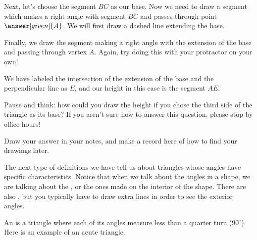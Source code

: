 \documentclass{ximera}
\begin{document}
\begin{example}
Next, let's choose the segment $BC$ as our base. Now we need to draw a segment which makes a right angle with segment $BC$ and passes through point $\answer[given]{A}$. We will first draw a dashed line extending the base.
\begin{image}
\end{image}
Finally, we draw the segment making a right angle with the extension of the base and passing through vertex $A$. Again, try doing this with your protractor on your own!
\begin{image}
\end{image}
We have labeled the intersection of the extension of the base and the perpendicular line as $E$, and our height in this case is the segment $AE$.
\end{example}
\begin{question}
Pause and think: how could you draw the height if you chose the third side of the triangle as its base? If you aren't sure how to answer this question, please stop by office hours!
\begin{freeResponse}
Draw your answer in your notes, and make a record here of how to find your drawings later.
\end{freeResponse}
\end{question}

The next type of definitions we have tell us about triangles whose angles have specific characteristics. Notice that when we talk about the angles in a shape, we are talking about the , or the ones made on the interior of the shape. There are also , but you typically have to draw extra lines in order to see the exterior angles.

\begin{definition}
	An  is a triangle where each of its angles measure less than a quarter turn ($90^{\circ}$). Here is an example of an acute triangle.
	\begin{image}
	\end{image}
\end{definition}
\end{document}
